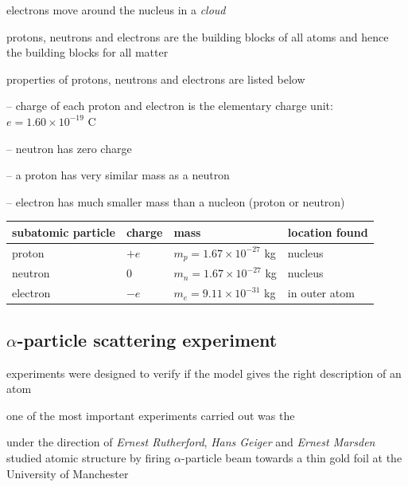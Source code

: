 electrons move around the nucleus in a \emph{cloud}

\cmt protons, neutrons and electrons are the building blocks of all atoms and hence the building blocks for all matter

\cmt properties of protons, neutrons and electrons are listed below

\begin{compactenum}
	\item[--] charge of each proton and electron is the elementary charge unit: $e = 1.60 \times10^{-19} \text{ C}$
	
	\item[--] neutron has zero charge
	
	\item[--] a proton has very similar mass as a neutron
	
	\item[--] electron has much smaller mass than a nucleon (proton or neutron)
\end{compactenum}

\begin{center}
	\begin{tabular}{|C{3.5cm}|C{1.6cm}|C{3.5cm}|C{2.8cm}|}
		\hline subatomic particle & charge & mass & location found \\ 
		\hline proton & $+e$ & $m_p = 1.67 \times 10^{-27}$ kg & nucleus \\ 
		\hline neutron & 0 & $m_n = 1.67 \times 10^{-27}$ kg & nucleus \\ 
		\hline electron & $-e$ & $m_e = 9.11 \times 10^{-31}$ kg & in outer atom \\ 
		\hline 
	\end{tabular}
\end{center}

\subsection{$\alpha$-particle scattering experiment}

experiments were designed to verify if the model gives the right description of an atom

one of the most important experiments carried out was the 

under the direction of \emph{Ernest Rutherford}, \emph{Hans Geiger} and \emph{Ernest Marsden} studied atomic structure by firing $\alpha$-particle beam towards a thin gold foil  at the University of Manchester

